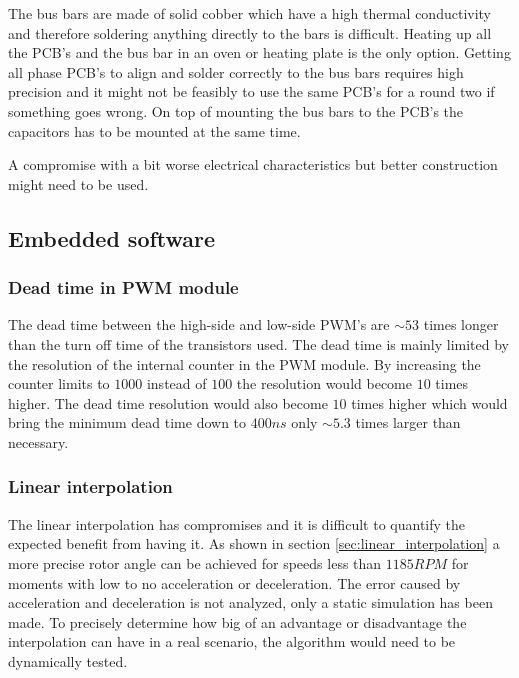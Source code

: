 The bus bars are made of solid cobber which have a high thermal conductivity and therefore soldering anything directly to the bars is difficult. Heating up all the PCB's and the bus bar in an oven or heating plate is the only option. 
Getting all phase PCB's to align and solder correctly to the bus bars requires high precision and it might not be feasibly to use the same PCB's for a round two if something goes wrong.
On top of mounting the bus bars to the PCB's the capacitors has to be mounted at the same time. 

A compromise with a bit worse electrical characteristics but better construction might need to be used.

\subsection{Embedded software}

\subsubsection{Dead time in PWM module}

The dead time between the high-side and low-side PWM's are $\sim 53$ times longer than the turn off time of the transistors used. The dead time is mainly limited by the resolution of the internal counter in the PWM module. By increasing the counter limits to $1000$ instead of $100$ the resolution would become $10$ times higher. The dead time resolution would also become $10$ times higher which would bring the minimum dead time down to $400ns$ only $\sim 5.3$ times larger than necessary.


\subsubsection{Linear interpolation}
The linear interpolation has compromises and it is difficult to quantify the expected benefit from having it. As shown in section \ref{sec:linear_interpolation} a more precise rotor angle can be achieved for speeds less than $1185RPM$ for moments with low to no acceleration or deceleration. The error caused by acceleration and deceleration is not analyzed, only a static simulation has been made. To precisely determine how big of an advantage or disadvantage the interpolation can have in a real scenario, the algorithm would need to be dynamically tested.




 
 